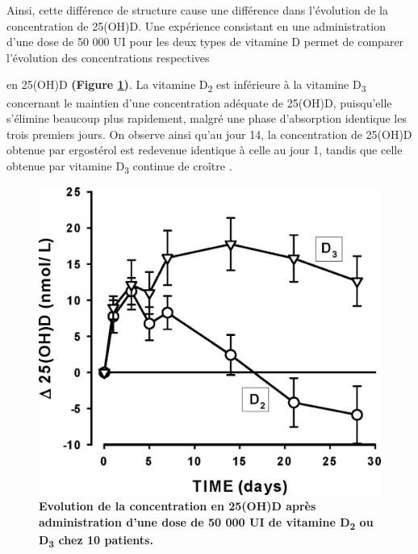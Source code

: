 \documentclass[
  a4paper,
  DIV=11,
  numbers=noendperiod,
  listof=totoc]{scrreprt}
\begin{document}
Ainsi, cette différence de structure cause une différence dans
l'évolution de la concentration de 25(OH)D. Une expérience consistant en
une administration d'une dose de 50 000 UI pour les deux types de
vitamine D permet de comparer l'évolution des concentrations respectives

en 25(OH)D \textbf{(Figure \ref{fig:PK-VD})}. La vitamine
D\textsubscript{2} est inférieure à la vitamine D\textsubscript{3}
concernant le maintien d'une concentration adéquate de 25(OH)D,
puisqu'elle s'élimine beaucoup plus rapidement, malgré une phase
d'absorption identique les trois premiers jours. On observe ainsi qu'au
jour 14, la concentration de 25(OH)D obtenue par ergostérol est
redevenue identique à celle au jour 1, tandis que celle obtenue par
vitamine D\textsubscript{3} continue de croître \autocite{Armas.2004}.

\hypertarget{fig:PK-VD}{%
\begin{figure}
\centering
\includegraphics{figures/PK_D2_vs_D3.jpeg}
\caption[{\textbf{Evolution de la concentration en 25(OH)D après
administration d'une dose de 50 000 UI de vitamine D\textsubscript{2} ou
D\textsubscript{3} chez 10 patients.}}]{\textbf{Evolution de la
concentration en 25(OH)D après administration d'une dose de 50 000 UI de
vitamine D\textsubscript{2} ou D\textsubscript{3} chez 10 patients.}
\autocite{Armas.2004}}
\label{fig:PK-VD}
\end{figure}
}
\end{document}

